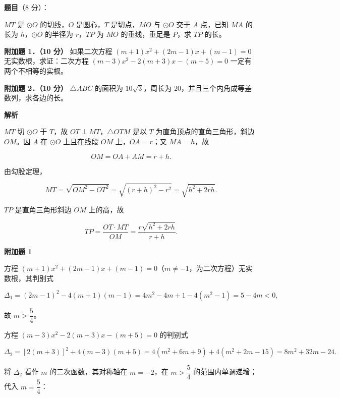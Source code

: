 \begin{answer}

\textbf{题目}（8 分）：

$MT$ 是 $\odot O$ 的切线，$O$ 是圆心，$T$ 是切点，$MO$ 与 $\odot O$ 交于 $A$ 点，已知 $MA$ 的长为 $h$，$\odot O$ 的半径为 $r$，$TP$ 为 $MO$ 的垂线，垂足是 $P$，求 $TP$ 的长。
\nopagebreak[4]
\begin{center}\end{center}
\nopagebreak[4]
\textbf{附加题 1．（10 分）} 如果二次方程 $(m+1)x^2+(2m-1)x+(m-1)=0$ 无实数根，求证：二次方程 $(m-3)x^2-2(m+3)x-(m+5)=0$ 一定有两个不相等的实根。

\textbf{附加题 2．（10 分）} $\triangle ABC$ 的面积为 $10\sqrt3$，周长为 $20$，并且三个内角成等差数列，求各边的长。

\textbf{解析}

$MT$ 切 $\odot O$ 于 $T$，故 $OT\perp MT$，$\triangle OTM$ 是以 $T$ 为直角顶点的直角三角形，斜边 $OM$。因 $A$ 在 $\odot O$ 上且在线段 $OM$ 上，$OA=r$；又 $MA=h$，故

\nopagebreak[4]
\[
OM=OA+AM=r+h.
\]

由勾股定理，

\nopagebreak[4]
\[
MT=\sqrt{OM^2-OT^2}=\sqrt{(r+h)^2-r^2}=\sqrt{h^2+2rh}.
\]

$TP$ 是直角三角形斜边 $OM$ 上的高，故

\nopagebreak[4]
\[
TP=\frac{OT\cdot MT}{OM}=\frac{r\sqrt{h^2+2rh}}{r+h}.
\]
\nopagebreak[4]
\begin{center}\end{center}
\nopagebreak[4]
\textbf{附加题 1}

方程 $(m+1)x^2+(2m-1)x+(m-1)=0$（$m\ne-1$，为二次方程）无实数根，其判别式

\nopagebreak[4]
\[
\Delta_1=(2m-1)^2-4(m+1)(m-1)=4m^2-4m+1-4(m^2-1)=5-4m<0,
\]

故 $m>\dfrac54$。

方程 $(m-3)x^2-2(m+3)x-(m+5)=0$ 的判别式

\nopagebreak[4]
\[
\Delta_2=[2(m+3)]^2+4(m-3)(m+5)
=4(m^2+6m+9)+4(m^2+2m-15)
=8m^2+32m-24.
\]

将 $\Delta_2$ 看作 $m$ 的二次函数，其对称轴在 $m=-2$，在 $m>\dfrac54$ 的范围内单调递增；代入 $m=\dfrac54$：


\end{answer}
